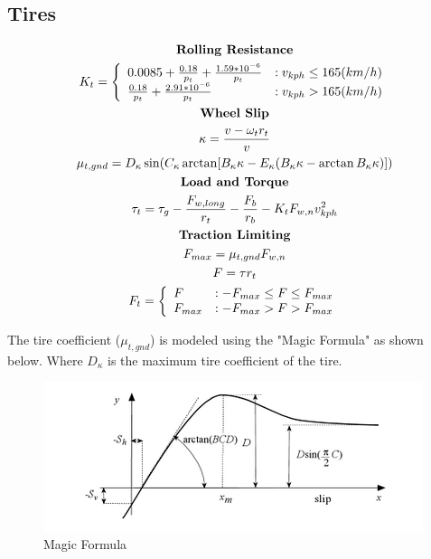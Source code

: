 \documentclass[../SimBALink.tex]{subfiles}
\begin{document}
\subsection{Tires}
\begin{gather}
\notag \textbf{Rolling Resistance} \\
K_t = 
\left\{
  \begin{array}{lr}
    0.0085 + \frac{0.18}{p_t} + \frac{1.59*10^{-6}}{p_t} & : v_{kph} \le 165 (km/h)\\
    \frac{0.18}{p_t} + \frac{2.91*10^{-6}}{p_t} & : v_{kph} > 165 (km/h)
  \end{array}
\right. \\
\notag \textbf{Wheel Slip} \\
\kappa = \frac{v - \omega_t r_t}{v} \\
\mu_{t,gnd} = D_{\kappa}\sin(C_{\kappa} \arctan[B_{\kappa}\kappa - E_{\kappa}(B_{\kappa}\kappa - \arctan B_{\kappa}\kappa)]) \\
\notag \textbf{Load and Torque} \\
\tau_t = \tau_g - \frac{F_{w,long}}{r_t} - \frac{F_b}{r_b} - K_t F_{w,n} v_{kph}^2 \\
\notag \textbf{Traction Limiting} \\
F_{max} = \mu_{t,gnd} F_{w,n} \\
F = \tau r_t \\
F_t =
\left\{
  \begin{array}{lr}
	F & : -F_{max} \le F \le F_{max} \\
	F_{max} & : -F_{max} > F > F_{max}
  \end{array}
\right. 
\end{gather}

The tire coefficient ($\mu_{t,gnd}$) is modeled using the "Magic Formula" as shown below. Where $D_{\kappa}$ is the maximum tire coefficient of the tire.

 \begin{figure}[h!]
  \centering
  \includegraphics[scale=1]{magic_formula}
  \caption{Magic Formula }
\end{figure}
\end{document}
